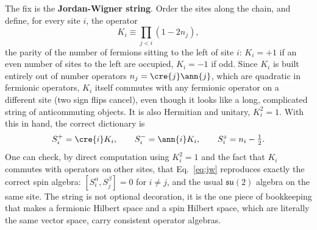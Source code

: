 \documentclass[all_sessions.tex]{subfiles}
\begin{document}
The fix is the \textbf{Jordan-Wigner string}. Order the sites along the chain, and define, for every
site $i$, the operator
\begin{equation}
  K_i \equiv \prod_{j<i}\left(1-2n_j\right),
\end{equation}
the parity of the number of fermions sitting to the left of site $i$: $K_i=+1$ if an even number of
sites to the left are occupied, $K_i=-1$ if odd. Since $K_i$ is built entirely out of number
operators $n_j=\cre{j}\ann{j}$, which are quadratic in fermionic operators, $K_i$ itself commutes
with any fermionic operator on a different site (two sign flips cancel), even though it looks like a
long, complicated string of anticommuting objects. It is also Hermitian and unitary, $K_i^2=1$. With
this in hand, the correct dictionary is
\begin{equation}
  S_i^+ = \cre{i}K_i, \qquad S_i^- = \ann{i}K_i, \qquad S_i^z = n_i - \tfrac12.
  \label{eq:jw}
\end{equation}
One can check, by direct computation using $K_i^2=1$ and the fact that $K_i$ commutes with operators
on other sites, that Eq.~\eqref{eq:jw} reproduces exactly the correct spin algebra: $[S_i^\alpha,
S_j^\beta]=0$ for $i\ne j$, and the usual $\mathfrak{su}(2)$ algebra on the same site. The string is
not optional decoration, it is the one piece of bookkeeping that makes a fermionic Hilbert space and
a spin Hilbert space, which are literally the same vector space, carry consistent operator algebras.
\end{document}

